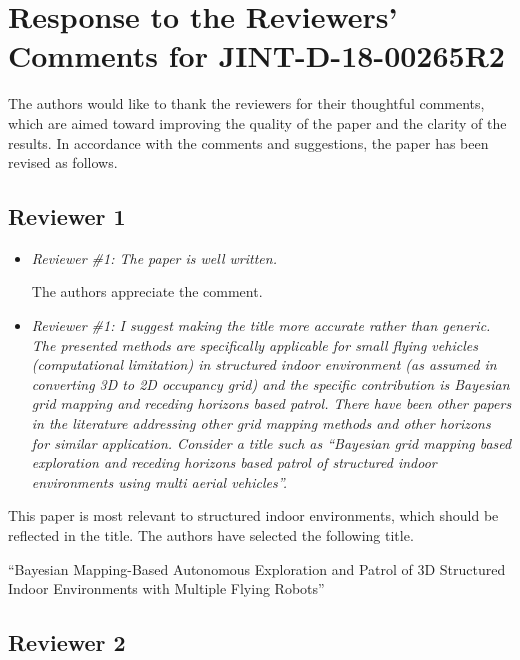 \documentclass[11pt]{article}
\newenvironment{correction}{\begin{list}{}{\setlength{\leftmargin}{1cm}\setlength{\rightmargin}{1cm}}\vspace{\parsep}\item[]``}{''\end{list}}
\begin{document}

\section*{Response to the Reviewers' Comments for JINT-D-18-00265R2}

The authors would like to thank the reviewers for their thoughtful comments, which are aimed toward improving the quality of the paper and the clarity of the results. In accordance with the comments and suggestions, the paper has been revised as follows. 


\subsection*{Reviewer 1}
\begin{itemize}
\item {\itshape Reviewer \#1: The paper is well written.}

The authors appreciate the comment.

\item {\itshape Reviewer \#1:  I suggest making the title more accurate rather than generic. The presented methods are specifically applicable for small flying vehicles (computational limitation) in structured indoor environment (as assumed in converting 3D to 2D occupancy grid) and the specific contribution is Bayesian grid mapping and receding horizons based patrol. There have been other papers in the literature addressing other grid mapping methods and other horizons for similar application. Consider a title such as ``Bayesian grid mapping based exploration and receding horizons based patrol of structured indoor environments using multi aerial vehicles''.} 
\end{itemize}

This paper is most relevant to structured indoor environments, which should be reflected in the title. The authors have selected the following title.

\begin{correction}Bayesian Mapping-Based Autonomous Exploration and Patrol of 3D Structured Indoor Environments with Multiple Flying Robots\end{correction}

\subsection*{Reviewer 2}

\setlength{\leftmargini}{0pt}
\end{document}
